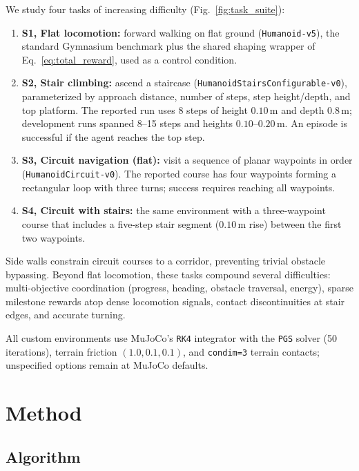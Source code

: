 \documentclass[conference,a4paper]{IEEEtran}
\begin{document}
We study four tasks of increasing difficulty (Fig.~\ref{fig:task_suite}):
\begin{enumerate}
    \item \textbf{S1, Flat locomotion:} forward walking on flat ground (\texttt{Humanoid-v5}), the standard Gymnasium benchmark plus the shared shaping wrapper of Eq.~\eqref{eq:total_reward}, used as a control condition.
    \item \textbf{S2, Stair climbing:} ascend a staircase (\texttt{Humanoid\allowbreak Stairs\allowbreak Configurable-v0}), parameterized by approach distance, number of steps, step height/depth, and top platform. The reported run uses 8 steps of height $0.10$\,m and depth $0.8$\,m; development runs spanned 8--15 steps and heights $0.10$--$0.20$\,m. An episode is successful if the agent reaches the top step.
    \item \textbf{S3, Circuit navigation (flat):} visit a sequence of planar waypoints in order (\texttt{HumanoidCircuit-v0}). The reported course has four waypoints forming a rectangular loop with three turns; success requires reaching all waypoints.
    \item \textbf{S4, Circuit with stairs:} the same environment with a three-waypoint course that includes a five-step stair segment ($0.10$\,m rise) between the first two waypoints.
\end{enumerate}
Side walls constrain circuit courses to a corridor, preventing trivial obstacle bypassing. Beyond flat locomotion, these tasks compound several difficulties: multi-objective coordination (progress, heading, obstacle traversal, energy), sparse milestone rewards atop dense locomotion signals, contact discontinuities at stair edges, and accurate turning.

All custom environments use MuJoCo's \texttt{RK4} integrator with the \texttt{PGS} solver (50 iterations), terrain friction $(1.0, 0.1, 0.1)$, and \texttt{condim=3} terrain contacts; unspecified options remain at MuJoCo defaults.

\section{Method}
\label{sec:method}

\subsection{Algorithm}
\label{sec:ppo}
\end{document}
